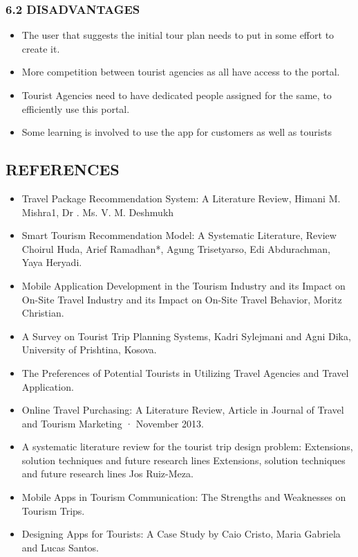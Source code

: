 \documentclass[12pt,a4paper]{article}
\begin{document}
\subsubsection*{6.2 DISADVANTAGES}
\begin{itemize}
		\item The user that suggests the initial tour plan needs to put in some effort to create it.
		\item More competition between tourist agencies as all have access to the portal.
		\item Tourist Agencies need to have dedicated people assigned for the same, to efficiently
	use this portal.
		\item Some learning is involved to use the app for customers as well as tourists
\end{itemize}
\newpage
\subsection*{\protect \centering REFERENCES}
\begin{itemize}
	\item Travel Package Recommendation System: A Literature Review, Himani M. Mishra1, Dr . Ms. V. M. Deshmukh
	
	\item  Smart Tourism Recommendation Model: A Systematic Literature, Review Choirul
	Huda, Arief Ramadhan*, Agung Trisetyarso, Edi Abdurachman, Yaya Heryadi.
	\item Mobile Application Development in the Tourism Industry and its Impact on On-Site
	Travel Industry and its Impact on On-Site Travel Behavior, Moritz Christian.
	\item A Survey on Tourist Trip Planning Systems, Kadri Sylejmani and Agni Dika,
	University of Prishtina, Kosova.
	\item The Preferences of Potential Tourists in Utilizing Travel Agencies and Travel
	Application.
	\item  Online Travel Purchasing: A Literature Review, Article in Journal of Travel and
	Tourism Marketing · November 2013.
	\item A systematic literature review for the tourist trip design problem: Extensions, solution
	techniques and future research lines Extensions, solution techniques and future
	research lines Jos Ruiz-Meza.
	\item Mobile Apps in Tourism Communication: The Strengths and Weaknesses on Tourism
	Trips.
	\item  Designing Apps for Tourists: A Case Study by Caio Cristo, Maria Gabriela and Lucas
	Santos.
\end{itemize}
\end{document}
